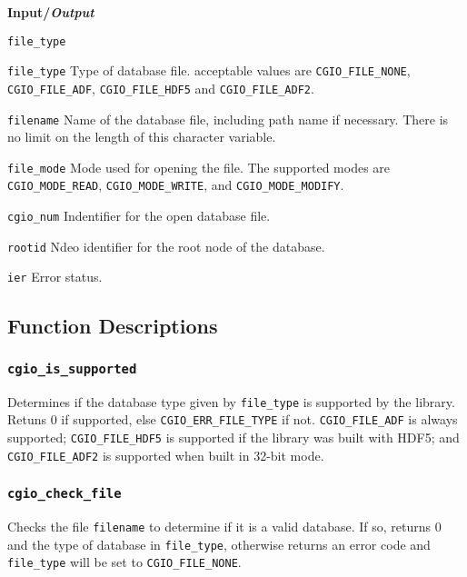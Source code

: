 \noindent
\textbf{\textcolor{input}{Input}/\textcolor{output}{\textit{Output}}}

\begin{Ventryi}{\texttt{file\_type}}\raggedright
\item [\texttt{file\_type}]
      Type of database file. acceptable values are \texttt{CGIO\_FILE\_NONE},
      \texttt{CGIO\_FILE\_ADF}, \texttt{CGIO\_FILE\_HDF5} and
      \texttt{CGIO\_FILE\_ADF2}.
\item [\texttt{filename}]
      Name of the database file, including path name if necessary.
      There is no limit on the length of this character variable.
\item [\texttt{file\_mode}]
      Mode used for opening the file.
      The supported modes are \texttt{CGIO\_MODE\_READ},
      \texttt{CGIO\_MODE\_WRITE}, and \texttt{CGIO\_MODE\_MODIFY}.
\item [\texttt{cgio\_num}]
      Indentifier for the open database file.
\item [\texttt{rootid}]
      Ndeo identifier for the root node of the database.
\item [\texttt{ier}]
      Error status.
\end{Ventryi}

\subsection{Function Descriptions}

\subsubsection{\texttt{cgio\_is\_supported}} \label{is_supported}
    \noindent
    Determines if the database type given by \texttt{file\_type} is supported
    by the library. Retuns 0 if supported, else \texttt{CGIO\_ERR\_FILE\_TYPE}
    if not. \texttt{CGIO\_FILE\_ADF} is always supported;
    \texttt{CGIO\_FILE\_HDF5} is supported if the library was built with HDF5;
    and \texttt{CGIO\_FILE\_ADF2} is supported when built in 32-bit mode.

\subsubsection{\texttt{cgio\_check\_file}} \label{check_file}
    \noindent
    Checks the file \texttt{filename} to determine if it is a valid database.
    If so, returns 0 and the type of database in \texttt{file\_type},
    otherwise returns an error code and \texttt{file\_type} will be set
    to \texttt{CGIO\_FILE\_NONE}.

